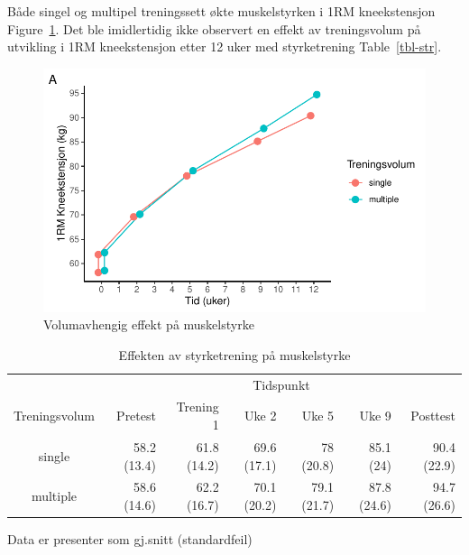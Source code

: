 \documentclass[
  letterpaper,
  DIV=11,
  numbers=noendperiod]{scrartcl}
\begin{document}
Både singel og multipel treningssett økte muskelstyrken i 1RM
kneekstensjon Figure~\ref{fig-str}. Det ble imidlertidig ikke observert
en effekt av treningsvolum på utvikling i 1RM kneekstensjon etter 12
uker med styrketrening Table~\ref{tbl-str}.

\begin{figure}

{\centering \includegraphics{assignment-5_files/figure-pdf/fig-str-1.pdf}

}

\caption{\label{fig-str}Volumavhengig effekt på muskelstyrke}

\end{figure}

\hypertarget{tbl-inc}{}
\setlength{\LTpost}{0mm}
\begin{longtable}{crrrrrr}
\caption{\label{tbl-inc}Effekten av styrketrening på muskelstyrke }\tabularnewline

\toprule
 & \multicolumn{6}{c}{Tidspunkt} \\ 
\cmidrule(lr){2-7}
Treningsvolum & Pretest & Trening 1 & Uke 2 & Uke 5 & Uke 9 & Posttest \\ 
\midrule
single & 58.2 (13.4) & 61.8 (14.2) & 69.6 (17.1) & 78 (20.8) & 85.1 (24) & 90.4 (22.9) \\ 
multiple & 58.6 (14.6) & 62.2 (16.7) & 70.1 (20.2) & 79.1 (21.7) & 87.8 (24.6) & 94.7 (26.6) \\ 
\bottomrule
\end{longtable}
\begin{minipage}{\linewidth}
Data er presenter som gj.snitt (standardfeil)\\
\end{minipage}
\end{document}
